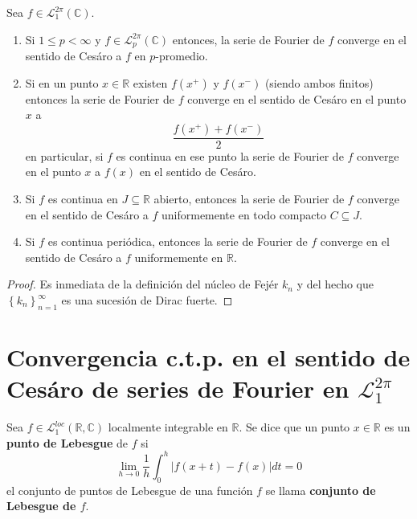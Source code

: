 \documentclass[12pt]{report}
\newcounter{it}
\theoremstyle{largebreak}
\renewcommand{\leq}{\ensuremath{\leqslant}}
\newcommand\abs[1]{\ensuremath{\left|#1\right|}}
\begin{document}
    \begin{theor}
        Sea $f\in\mathcal{L}_1^{2\pi}(\mathbb{C})$.
        \begin{enumerate}
            \item Si $1\leq p<\infty$ y $f\in\mathcal{L}_p^{2\pi}(\mathbb{C})$ entonces, la serie de Fourier de $f$ converge en el sentido de Cesáro a $f$ en $p$-promedio.
            \item Si en un punto $x\in\mathbb{R}$ existen $f(x^+)$ y $f(x^-)$ (siendo ambos finitos) entonces la serie de Fourier de $f$ converge en el sentido de Cesáro en el punto $x$ a
            \begin{equation*}
                \frac{f(x^+)+f(x^-)}{2}
            \end{equation*}
            en particular, si $f$ es continua en ese punto la serie de Fourier de $f$ converge en el punto $x$ a $f(x)$ en el sentido de Cesáro.
            \item Si $f$ es continua en $J\subseteq\mathbb{R}$ abierto, entonces la serie de Fourier de $f$ converge en el sentido de Cesáro a $f$ uniformemente en todo compacto $C\subseteq J$.
            \item Si $f$ es continua periódica, entonces la serie de Fourier de $f$ converge en el sentido de Cesáro a $f$ uniformemente en $\mathbb{R}$.
        \end{enumerate}
    \end{theor}

    \begin{proof}
        Es inmediata de la definición del núcleo de Fejér $k_n$ y del hecho que $\left\{k_n \right\}_{ n=1}^\infty$ es una sucesión de Dirac fuerte.
    \end{proof}

    \section{Convergencia c.t.p. en el sentido de Cesáro de series de Fourier en $\mathcal{L}_1^{2\pi}$}

    \begin{mydef}
        Sea $f\in\mathcal{L}_1^{loc}(\mathbb{R},\mathbb{C})$ localmente integrable en $\mathbb{R}$. Se dice que un punto $x\in\mathbb{R}$ es un \textbf{punto de Lebesgue} de $f$ si
        \begin{equation*}
            \lim_{ h\rightarrow 0}\frac{1}{h}\int_0^h\abs{f(x+t)-f(x)}dt=0
        \end{equation*}
        el conjunto de puntos de Lebesgue de una función $f$ se llama \textbf{conjunto de Lebesgue de $f$}.
    \end{mydef}
\end{document}

